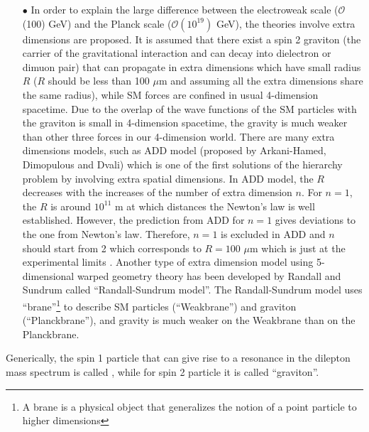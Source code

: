 \begin{enumerate}
\item[$\bullet$] In order to explain the large difference between the electroweak scale ($\mathcal{O}$(100) GeV) and the Planck scale ($\mathcal{O}(10^{19})$ GeV), the theories involve extra dimensions are proposed. It is assumed that there exist a spin 2 graviton (the carrier of the gravitational interaction and can decay into dielectron or dimuon pair) that can propagate in extra dimensions which have small radius $R$ ($R$ should be less than 100 $\mu$m \cite{Schwarz} and assuming all the extra dimensions share the same radius), while SM forces are confined in usual 4-dimension spacetime. Due to the overlap of the wave functions of the SM particles with the graviton is small in 4-dimension spacetime, the gravity is much weaker than other three forces in our 4-dimension world. There are many extra dimensions models, such as ADD model (proposed by Arkani-Hamed, Dimopulous and Dvali) \cite{arkani98:hlz} which is one of the first solutions of the hierarchy problem by involving extra spatial dimensions. In ADD model, the $R$ decreases with the increases of the number of extra dimension $n$. For $n=1$, the $R$ is around $10^{11}$ m at which distances the Newton's law is well established. However, the prediction from ADD for $n=1$ gives deviations to the one from Newton's law. Therefore, $n=1$ is excluded in ADD and $n$ should start from 2 which corresponds to $R=100$ $\mu$m which is just at the experimental limits \cite{Schwarz}. Another type of extra dimension model using 5-dimensional warped geometry theory has been developed by Randall and Sundrum \cite{Sundrum} called ``Randall-Sundrum model''. The Randall-Sundrum model uses ``brane''\footnote{A brane is a physical object that generalizes the notion of a point particle to higher dimensions} to describe SM particles (``Weakbrane'') and graviton (``Planckbrane''), and gravity is much weaker on the Weakbrane than on the Planckbrane.

\end{enumerate}

Generically, the spin 1 particle that can give rise to a resonance in the dilepton mass spectrum is called \ZP, while for spin 2 particle it is called ``graviton''.

